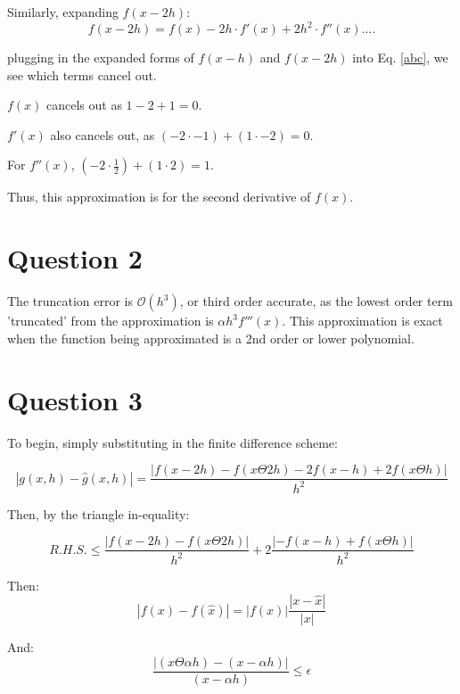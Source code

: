 \documentclass{article}
\begin{document}
Similarly, expanding $f(x-2h)$:
\begin{equation}
    \label{fx_2h}
    f(x-2h) = f(x) -2h\cdot f'(x) + 2h^2\cdot f''(x) ....
\end{equation}

plugging in the expanded forms of $f(x-h)$ and $f(x-2h)$ into Eq. \ref{abc}, we see which terms cancel out. 

$f(x)$ cancels out as $1-2+1 = 0$.

$f'(x)$ also cancels out, as $(-2 \cdot -1) + (1 \cdot-2) = 0$.

For $f''(x)$, $(-2 \cdot \frac{1}{2}) + (1 \cdot 2) = 1$.

Thus, this approximation is for the second derivative of $f(x)$.

\section{Question 2}
The truncation error is $\mathcal{O}(h^3)$, or third order accurate, as the lowest order term 'truncated' from the approximation is $\alpha h^3f'''(x)$. This approximation is exact when the function being approximated is a 2nd order or lower polynomial.

\section{Question 3}
To begin, simply substituting in the finite difference scheme:

\begin{equation}
    \left| g(x,h) - \hat{g}(x,h) \right| = \frac{\left| f(x-2h)-f(x \Theta 2h) - 2f(x-h) + 2f(x \Theta h) \right|}{h^2}
\end{equation}

Then, by the triangle in-equality:

\begin{equation}
    R.H.S. \leq \frac{\left| f(x-2h)-f(x \Theta 2h) \right|}{h^2} + 2\frac{\left|-f(x-h) + f(x \Theta h) \right|}{h^2}
\end{equation}

Then:
\begin{equation}
    \left| f(x) - f(\hat{x})\right| = \left|f(x)\right| \frac{\left|x-\hat{x}\right|}{\left|x\right|}
\end{equation}

And:
\begin{equation}
    \frac{\left| (x\Theta \alpha h) - (x - \alpha h) \right|}{(x - \alpha h)} \leq \epsilon
\end{equation}
\end{document}
